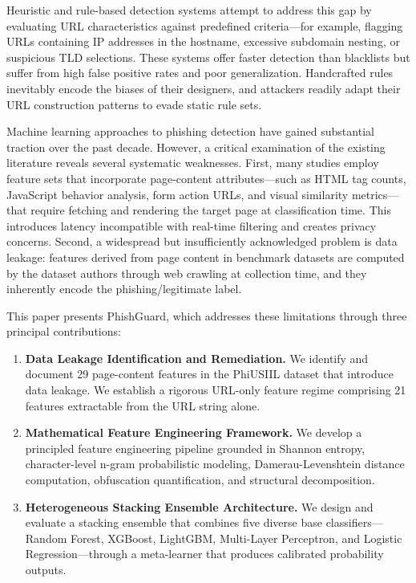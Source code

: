 \documentclass[conference]{IEEEtran}
\begin{document}
Heuristic and rule-based detection systems attempt to address this gap by evaluating URL characteristics against predefined criteria---for example, flagging URLs containing IP addresses in the hostname, excessive subdomain nesting, or suspicious TLD selections. These systems offer faster detection than blacklists but suffer from high false positive rates and poor generalization. Handcrafted rules inevitably encode the biases of their designers, and attackers readily adapt their URL construction patterns to evade static rule sets.

Machine learning approaches to phishing detection have gained substantial traction over the past decade. However, a critical examination of the existing literature reveals several systematic weaknesses. First, many studies employ feature sets that incorporate page-content attributes---such as HTML tag counts, JavaScript behavior analysis, form action URLs, and visual similarity metrics---that require fetching and rendering the target page at classification time. This introduces latency incompatible with real-time filtering and creates privacy concerns. Second, a widespread but insufficiently acknowledged problem is data leakage: features derived from page content in benchmark datasets are computed by the dataset authors through web crawling at collection time, and they inherently encode the phishing/legitimate label.

This paper presents PhishGuard, which addresses these limitations through three principal contributions:

\begin{enumerate}
    \item \textbf{Data Leakage Identification and Remediation.} We identify and document 29 page-content features in the PhiUSIIL dataset that introduce data leakage. We establish a rigorous URL-only feature regime comprising 21 features extractable from the URL string alone.
    \item \textbf{Mathematical Feature Engineering Framework.} We develop a principled feature engineering pipeline grounded in Shannon entropy, character-level n-gram probabilistic modeling, Damerau-Levenshtein distance computation, obfuscation quantification, and structural decomposition.
    \item \textbf{Heterogeneous Stacking Ensemble Architecture.} We design and evaluate a stacking ensemble that combines five diverse base classifiers---Random Forest, XGBoost, LightGBM, Multi-Layer Perceptron, and Logistic Regression---through a meta-learner that produces calibrated probability outputs.
\end{enumerate}
\end{document}
